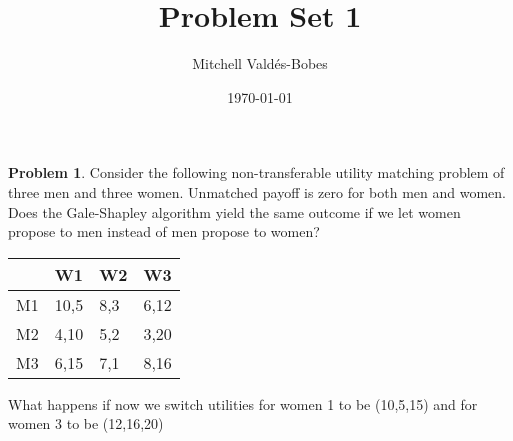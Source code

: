 \documentclass{article}
\title{Problem Set 1}
\author{Mitchell Valdés-Bobes}
\date{\today}
\theoremstyle{definition}
\newtheorem{problem}{Problem}
\begin{document}
\maketitle

\begin{problem}
Consider the following non-transferable utility matching problem of three men and three women. Unmatched payoff is zero for both men and women. Does the Gale-Shapley algorithm yield the same outcome if we let women propose to men instead of men propose to women?

\begin{center}
\begin{tabular}{|l|l|l|l|}
\hline & W1 & W2 & W3 \\
\hline M1 & 10,5 & 8,3 & 6,12 \\
\hline M2 & 4,10 & 5,2 & 3,20 \\
\hline M3 & 6,15 & 7,1 & 8,16 \\
\hline
\end{tabular}    
\end{center}


What happens if now we switch utilities for women 1 to be (10,5,15) and for women 3 to be (12,16,20)
\end{problem}
\end{document}
